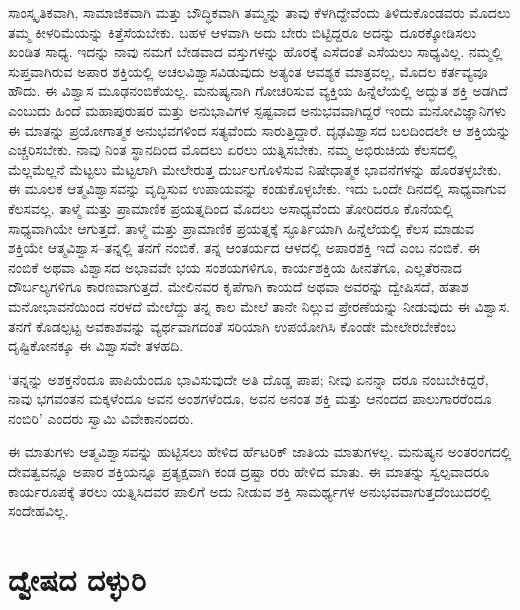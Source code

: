 ಸಾಂಸ್ಕೃತಿಕವಾಗಿ, ಸಾಮಾಜಿಕವಾಗಿ ಮತ್ತು ಬೌದ್ಧಿಕವಾಗಿ ತಮ್ಮನ್ನು ತಾವು ಕೆಳಗಿದ್ದೇವೆಂದು ತಿಳಿದು\-ಕೊಂಡವರು ಮೊದಲು ತಮ್ಮ ಕೀಳರಿಮೆಯನ್ನು ಕಿತ್ತೆಸೆಯಬೇಕು. ಬಹಳ ಆಳವಾಗಿ ಅದು ಬೇರು ಬಿಟ್ಟಿದ್ದರೂ ಅದನ್ನು ದೂರಕ್ಕೋಡಿಸಲು ಖಂಡಿತ ಸಾಧ್ಯ. ಇದನ್ನು ನಾವು ನಮಗೆ ಬೇಡವಾದ ವಸ್ತುಗಳನ್ನು ಹೊರಕ್ಕೆ ಎಸೆದಂತೆ ಎಸೆಯಲು ಸಾಧ್ಯವಿಲ್ಲ. ನಮ್ಮಲ್ಲಿ ಸುಪ್ತವಾಗಿರುವ ಅಪಾರ ಶಕ್ತಿಯಲ್ಲಿ ಅಚಲವಿಶ್ವಾಸವಿಡುವುದು ಅತ್ಯಂತ ಆವಶ್ಯಕ ಮಾತ್ರವಲ್ಲ, ಮೊದಲ ಕರ್ತವ್ಯವೂ ಹೌದು. ಈ ವಿಶ್ವಾಸ ಮೂಢನಂಬಿಕೆಯಲ್ಲ. ಮನುಷ್ಯನಾಗಿ ಗೋಚರಿಸುವ ವ್ಯಕ್ತಿಯ ಹಿನ್ನೆಲೆಯಲ್ಲಿ ಅದ್ಭುತ ಶಕ್ತಿ ಅಡಗಿದೆ ಎಂಬುದು ಹಿಂದೆ ಮಹಾಪುರುಷರ ಮತ್ತು ಅನುಭಾವಿಗಳ ಸ್ಪಷ್ಟವಾದ ಅನುಭವವಾಗಿದ್ದರೆ ಇಂದು ಮನೋವಿಜ್ಞಾನಿಗಳು ಈ ಮಾತನ್ನು ಪ್ರಯೋಗಾತ್ಮಕ ಅನುಭವಗಳಿಂದ ಸತ್ಯವೆಂದು ಸಾರುತ್ತಿದ್ದಾರೆ. ದೃಢವಿಶ್ವಾಸದ ಬಲದಿಂದಲೇ ಆ ಶಕ್ತಿಯನ್ನು ಎಚ್ಚರಿಸಬೇಕು. ನಾವು ನಿಂತ ಸ್ಥಾನದಿಂದ ಮೊದಲು ಏರಲು ಯತ್ನಿಸಬೇಕು. ನಮ್ಮ ಅಭಿರುಚಿಯ ಕೆಲಸದಲ್ಲಿ ಮೆಲ್ಲಮೆಲ್ಲನೆ ಮೆಟ್ಟಲು ಮೆಟ್ಟಲಾಗಿ ಮೇಲೇರುತ್ತ ದುರ್ಬಲಗೊಳಿಸುವ ನಿಷೇಧಾತ್ಮಕ ಭಾವನೆಗಳನ್ನು ಹೊರತಳ್ಳಬೇಕು. ಈ ಮೂಲಕ ಆತ್ಮವಿಶ್ವಾಸವನ್ನು ವೃದ್ಧಿಸುವ ಉಪಾಯವನ್ನು ಕಂಡುಕೊಳ್ಳಬೇಕು. ಇದು ಒಂದೇ ದಿನದಲ್ಲಿ ಸಾಧ್ಯವಾಗುವ ಕೆಲಸವಲ್ಲ. ತಾಳ್ಮೆ ಮತ್ತು ಪ್ರಾಮಾಣಿಕ ಪ್ರಯತ್ನದಿಂದ ಮೊದಲು ಅಸಾಧ್ಯವೆಂದು ತೋರಿದರೂ ಕೊನೆಯಲ್ಲಿ ಸಾಧ್ಯವಾಗಿಯೇ ಆಗುತ್ತದೆ. ತಾಳ್ಮೆ ಮತ್ತು ಪ್ರಾಮಾಣಿಕ ಪ್ರಯತ್ನಕ್ಕೆ ಸ್ಫೂರ್ತಿಯಾಗಿ ಹಿನ್ನೆಲೆಯಲ್ಲಿ ಕೆಲಸ ಮಾಡುವ ಶಕ್ತಿಯೇ ಆತ್ಮವಿಶ್ವಾಸ–ತನ್ನಲ್ಲಿ ತನಗೆ ನಂಬಿಕೆ. ತನ್ನ ಆಂತರ್ಯದ ಆಳದಲ್ಲಿ ಅಪಾರಶಕ್ತಿ ಇದೆ ಎಂಬ ನಂಬಿಕೆ. ಈ ನಂಬಿಕೆ ಅಥವಾ ವಿಶ್ವಾಸದ ಅಭಾವವೇ ಭಯ ಸಂಶಯಗಳಿಗೂ, ಕಾರ್ಯಶಕ್ತಿಯ ಹೀನತೆಗೂ, ಎಲ್ಲತೆರನಾದ ದೌರ್ಬಲ್ಯಗಳಿಗೂ ಕಾರಣವಾಗುತ್ತದೆ. ಮೇಲಿನವರ ಕೃಪೆಗಾಗಿ ಕಾಯದೆ ಅಥವಾ ಅವರನ್ನು ದ್ವೇಷಿಸದೆ, ಹತಾಶ ಮನೋಭಾವನೆಯಿಂದ ನರಳದೆ ಮೇಲೆದ್ದು ತನ್ನ ಕಾಲ ಮೇಲೆ ತಾನೇ ನಿಲ್ಲುವ ಪ್ರೇರಣೆಯನ್ನು ನೀಡುವುದು ಈ ವಿಶ್ವಾಸ. ತನಗೆ ಕೊಡಲ್ಪಟ್ಟ ಅವಕಾಶವನ್ನು ವ್ಯರ್ಥವಾಗದಂತೆ ಸರಿಯಾಗಿ ಉಪಯೋಗಿಸಿ ಕೊಂಡೇ ಮೇಲೇರಬೇಕೆಂಬ ದೃಷ್ಟಿಕೋನಕ್ಕೂ ಈ ವಿಶ್ವಾಸವೇ ತಳಹದಿ.

‘ತನ್ನನ್ನು ಅಶಕ್ತನೆಂದೂ ಪಾಪಿಯೆಂದೂ ಭಾವಿಸುವುದೇ ಅತಿ ದೊಡ್ಡ ಪಾಪ; ನೀವು ಏನನ್ನಾ ದರೂ ನಂಬಬೇಕಿದ್ದರೆ, ನಾವು ಭಗವಂತನ ಮಕ್ಕಳೆಂದೂ ಅವನ ಅಂಶಗಳೆಂದೂ, ಅವನ ಅನಂತ ಶಕ್ತಿ ಮತ್ತು ಆನಂದದ ಪಾಲುಗಾರರೆಂದೂ ನಂಬಿರಿ’ ಎಂದರು ಸ್ವಾಮಿ ವಿವೇಕಾನಂದರು.

ಈ ಮಾತುಗಳು ಆತ್ಮವಿಶ್ವಾಸವನ್ನು ಹುಟ್ಟಿಸಲು ಹೇಳಿದ ರ್ಹೆಟರಿಕ್ ಜಾತಿಯ ಮಾತುಗಳಲ್ಲ. ಮನುಷ್ಯನ ಅಂತರಂಗದಲ್ಲಿ ದೇವತ್ವವನ್ನೂ ಅಪಾರ ಶಕ್ತಿಯನ್ನೂ ಪ್ರತ್ಯಕ್ಷವಾಗಿ ಕಂಡ ದ್ರಷ್ಟಾ ರರು ಹೇಳಿದ ಮಾತು. ಈ ಮಾತನ್ನು ಸ್ವಲ್ಪವಾದರೂ ಕಾರ್ಯರೂಪಕ್ಕೆ ತರಲು ಯತ್ನಿಸಿದವರ ಪಾಲಿಗೆ ಅದು ನೀಡುವ ಶಕ್ತಿ ಸಾಮರ್ಥ್ಯಗಳ ಅನುಭವವಾಗುತ್ತದೆಂಬುದರಲ್ಲಿ ಸಂದೇಹವಿಲ್ಲ.


\section*{ದ್ವೇಷದ ದಳ್ಳುರಿ}


